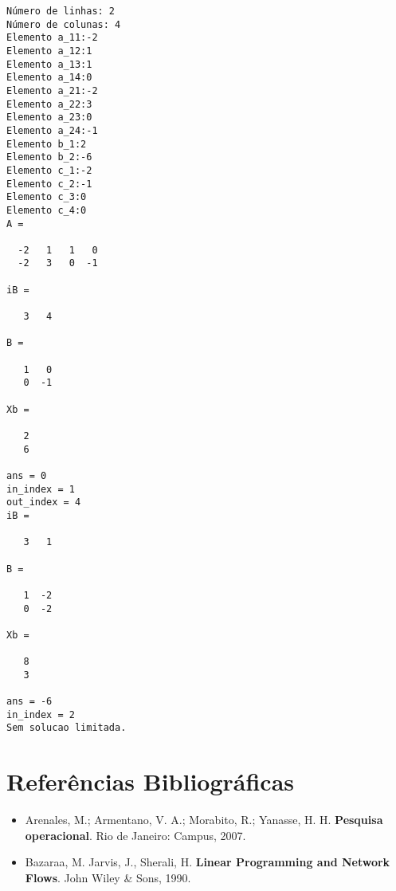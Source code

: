 \documentclass[]{article}
\begin{document}
\begin{verbatim}
Número de linhas: 2
Número de colunas: 4
Elemento a_11:-2
Elemento a_12:1
Elemento a_13:1
Elemento a_14:0
Elemento a_21:-2
Elemento a_22:3
Elemento a_23:0
Elemento a_24:-1
Elemento b_1:2
Elemento b_2:-6
Elemento c_1:-2
Elemento c_2:-1
Elemento c_3:0
Elemento c_4:0
A =

  -2   1   1   0
  -2   3   0  -1

iB =

   3   4

B =

   1   0
   0  -1

Xb =

   2
   6

ans = 0
in_index = 1
out_index = 4
iB =

   3   1

B =

   1  -2
   0  -2

Xb =

   8
   3

ans = -6
in_index = 2
Sem solucao limitada.
\end{verbatim}
\section{Referências Bibliográficas}
\begin{itemize}
\item Arenales, M.; Armentano, V. A.; Morabito, R.; Yanasse, H. H. \textbf{Pesquisa operacional}. Rio de Janeiro: Campus, 2007.
\item Bazaraa, M. Jarvis, J., Sherali, H. \textbf{Linear Programming and Network Flows}. John Wiley \& Sons, 1990.
\end{itemize}
\end{document}
